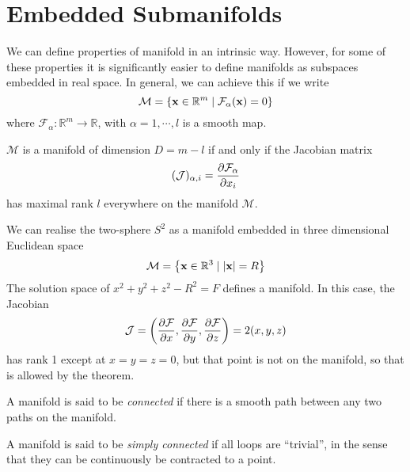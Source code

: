 
\section{Embedded Submanifolds}%
\label{sec:embedded submanifolds}

We can define properties of manifold in an intrinsic way. However, for some of these properties it is significantly easier to define manifolds as subspaces embedded in real space.
In general, we can achieve this if we write
\begin{equation}
  \mathcal{M} = \left\{ \vb{x} \in \mathbb{R}^m \mid \mathcal{F}_\alpha(\vb{x}) = 0 \right\}
\end{equation}
where $\mathcal{F}_\alpha: \mathbb{R}^m \to \mathbb{R}$, with $\alpha = 1, \cdots, l$ is a smooth map.

\begin{theorem}
$\mathcal{M}$ is a manifold of dimension $D = m-l$ if and only if the Jacobian matrix
\begin{equation}
  (\mathcal{J})_{\alpha, i} = \pdv{\mathcal{F}_\alpha}{x_i}
\end{equation}
has maximal rank $l$ everywhere on the manifold $\mathcal{M}$.
\end{theorem}

\begin{example}[$S^2$]
We can realise the two-sphere $S^2$ as a manifold embedded in three dimensional Euclidean space
\begin{equation}
  \mathcal{M} = \left\{\vb{x} \in \mathbb{R}^3 \mid \abs{\vb{x}} = R \right\}
\end{equation}
The solution space of $x^2 + y^2 + z^2 -R^2 = F$ defines a manifold.
In this case, the Jacobian 
\begin{equation}
  \mathcal{J} = \left( \pdv{\mathcal{F}}{x}, \pdv{\mathcal{F}}{y}, \pdv{\mathcal{F}}{z}\right) = 2(x, y, z)
\end{equation}
has rank 1 except at $x = y = z = 0$, but that point is not on the manifold, so that is allowed by the theorem.
\end{example}

\begin{definition}[connected]
  A manifold is said to be \emph{connected} if there is a smooth path between any two paths on the manifold.
\end{definition} 


\begin{definition}
  A manifold is said to be \emph{simply connected} if all loops are ``trivial'', in the sense that they can be continuously be contracted to a point.
\end{definition}

